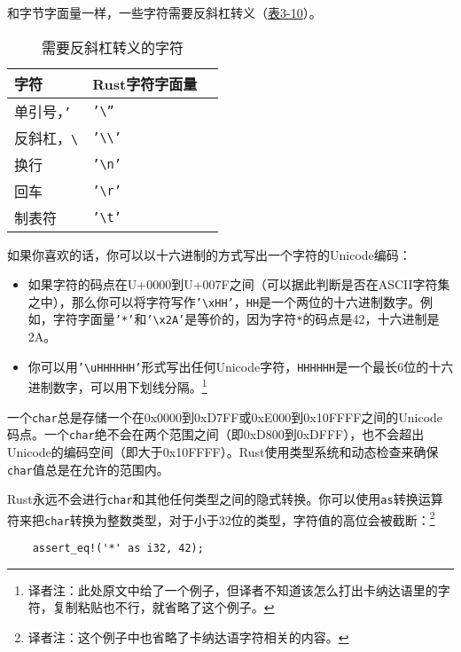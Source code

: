 和字节字面量一样，一些字符需要反斜杠转义（\hyperref[t3-10]{表3-10}）。
\begin{table}[htbp]
    \centering
    \caption{需要反斜杠转义的字符}
    \label{t3-10}
    \begin{tabular}{lll}
        \hline
        \textbf{字符}   &   \textbf{Rust字符字面量} \\
        \hline
        单引号，\texttt{'}   &   \texttt{'\textbackslash''} \\
        \rowcolor{tablecolor}
        反斜杠，\texttt{\textbackslash} &    \texttt{'\textbackslash\textbackslash'} \\
        换行        &    \texttt{'\textbackslash n'} \\
        \rowcolor{tablecolor}
        回车        &   \texttt{'\textbackslash r'} \\
        制表符      &   \texttt{'\textbackslash t'} \\
    \end{tabular}
\end{table}

如果你喜欢的话，你可以以十六进制的方式写出一个字符的Unicode编码：
\begin{itemize}
    \item 如果字符的码点在U+0000到U+007F之间（可以据此判断是否在ASCII字符集之中），那么你可以将字符写作\texttt{'\textbackslash xHH'}，\texttt{HH}是一个两位的十六进制数字。例如，字符字面量\texttt{'*'}和\texttt{'\textbackslash x2A'}是等价的，因为字符\texttt{*}的码点是42，十六进制是2A。
    \item 你可以用\texttt{'\textbackslash u{HHHHHH}'}形式写出任何Unicode字符，\texttt{HHHHHH}是一个最长6位的十六进制数字，可以用下划线分隔。\footnote{译者注：此处原文中给了一个例子，但译者不知道该怎么打出卡纳达语里的字符，复制粘贴也不行，就省略了这个例子。}
\end{itemize}

一个\texttt{char}总是存储一个在0x0000到0xD7FF或0xE000到0x10FFFF之间的Unicode码点。一个\texttt{char}绝不会在两个范围之间（即0xD800到0xDFFF），也不会超出Unicode的编码空间（即大于0x10FFFF）。Rust使用类型系统和动态检查来确保\texttt{char}值总是在允许的范围内。

Rust永远不会进行\texttt{char}和其他任何类型之间的隐式转换。你可以使用\texttt{as}转换运算符来把\texttt{char}转换为整数类型，对于小于32位的类型，字符值的高位会被截断：\footnote{译者注：这个例子中也省略了卡纳达语字符相关的内容。}
\begin{verbatim}
    assert_eq!('*' as i32, 42);
\end{verbatim}

